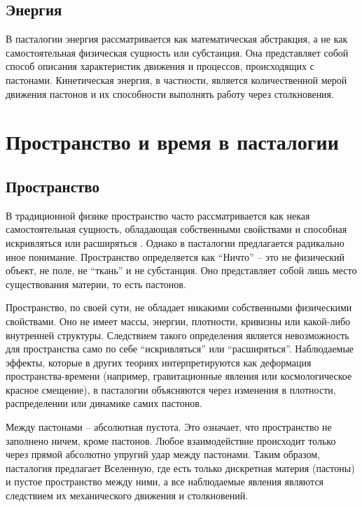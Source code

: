 \documentclass[pdflatex,sn-mathphys-num,referee]{sn-jnl}
\begin{document}
\subsection{Энергия}\label{subsec:energy}

В пасталогии энергия рассматривается как математическая абстракция, а не как самостоятельная физическая сущность или субстанция. Она представляет собой способ описания характеристик движения и процессов, происходящих с пастонами. Кинетическая энергия, в частности, является количественной мерой движения пастонов и их способности выполнять работу через столкновения.

\section{Пространство и время в пасталогии}\label{sec:space-time}

\subsection{Пространство}\label{subsec:space}

В традиционной физике пространство часто рассматривается как некая самостоятельная сущность, обладающая собственными свойствами и способная искривляться или расширяться \cite{mtw1973}. Однако в пасталогии предлагается радикально иное понимание. Пространство определяется как ``Ничто'' -- это не физический объект, не поле, не ``ткань'' и не субстанция. Оно представляет собой лишь место существования материи, то есть пастонов.

Пространство, по своей сути, не обладает никакими собственными физическими свойствами. Оно не имеет массы, энергии, плотности, кривизны или какой-либо внутренней структуры. Следствием такого определения является невозможность для пространства само по себе ``искривляться'' или ``расширяться''. Наблюдаемые эффекты, которые в других теориях интерпретируются как деформация пространства-времени (например, гравитационные явления или космологическое красное смещение), в пасталогии объясняются через изменения в плотности, распределении или динамике самих пастонов.

Между пастонами -- абсолютная пустота. Это означает, что пространство не заполнено ничем, кроме пастонов. Любое взаимодействие происходит только через прямой абсолютно упругий удар между пастонами. Таким образом, пасталогия предлагает Вселенную, где есть только дискретная материя (пастоны) и пустое пространство между ними, а все наблюдаемые явления являются следствием их механического движения и столкновений.
\end{document}
